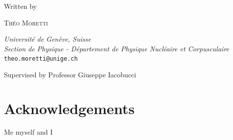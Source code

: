 \documentclass[a4paper, 11pt, twoside]{report}
\begin{document}
\begin{titlepage}
	Written by
	
	\vspace{0.5\baselineskip} %
	
	{\scshape\large Théo Moretti} %

	\vspace{2\baselineskip} %
	
	\textit{\large Université de Genève, Suisse \\
			Section de Physique - Département de Physique Nucléaire et Corpusculaire \\}
			\texttt{theo.moretti@unige.ch} \\ %
	
	\vspace{2\baselineskip} %

Supervised by Professor Giuseppe Iacobucci
	
	
	\vspace{0.3\baselineskip} %
	
	

\end{titlepage}

				
\newpage
\tableofcontents
\thispagestyle{empty}
\newpage
\setcounter{page}{1}

\chapter*{Acknowledgements}
Me myself and I 



\vspace{15mm}


\hspace{120mm}


\clearpage


\clearpage


\clearpage


\clearpage


\clearpage


\clearpage


\clearpage


\clearpage

\printbibliography

\end{document}
